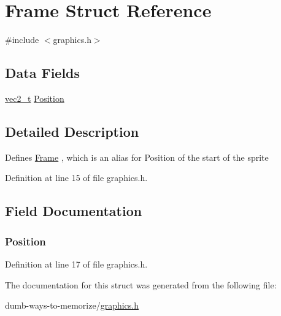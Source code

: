 \hypertarget{struct_frame}{}\section{Frame Struct Reference}
\label{struct_frame}


{\ttfamily \#include $<$graphics.\+h$>$}

\subsection*{Data Fields}
\begin{DoxyCompactItemize}
\item 
\hyperlink{globals_8h_a773f2054819bb6014f1e50baa39cb5e3}{vec2\+\_\+t} \hyperlink{struct_frame_ae69b5c22d5cd3911965dc992d40ba4fc}{Position}
\end{DoxyCompactItemize}


\subsection{Detailed Description}
Defines \hyperlink{struct_frame}{Frame} , which is an alias for Position of the start of the sprite 

Definition at line 15 of file graphics.\+h.



\subsection{Field Documentation}
\subsubsection[{\texorpdfstring{Position}{Position}}]{ Position}\hypertarget{struct_frame_ae69b5c22d5cd3911965dc992d40ba4fc}{}\label{struct_frame_ae69b5c22d5cd3911965dc992d40ba4fc}


Definition at line 17 of file graphics.\+h.



The documentation for this struct was generated from the following file\+:\begin{DoxyCompactItemize}
\item 
dumb-\/ways-\/to-\/memorize/\hyperlink{graphics_8h}{graphics.\+h}\end{DoxyCompactItemize}
